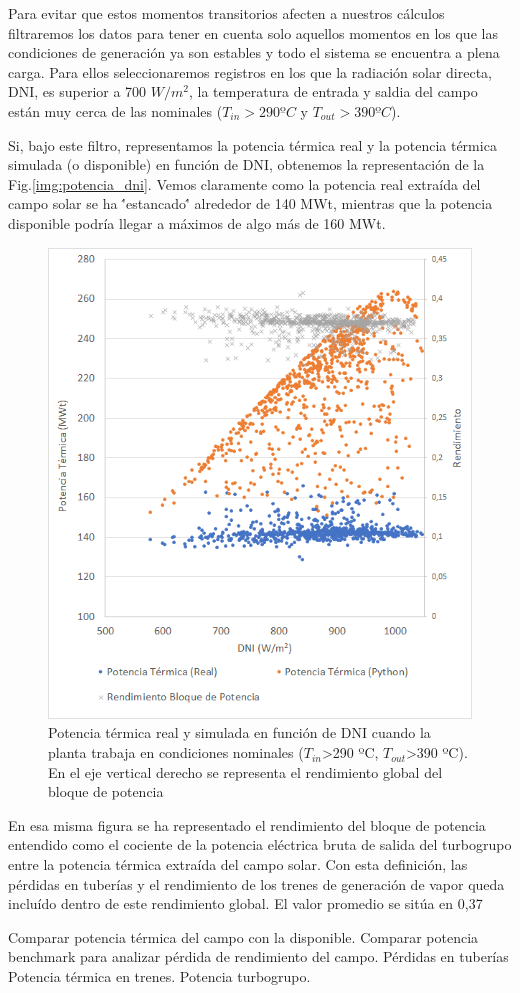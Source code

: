 Para evitar que estos momentos transitorios afecten a nuestros cálculos filtraremos los datos para tener en cuenta solo aquellos momentos en los que las condiciones de generación ya son estables y todo el sistema se encuentra a plena carga. Para ellos seleccionaremos registros en los que la radiación solar directa, DNI, es superior a 700 $W/m^2$, la temperatura de entrada y saldia del campo están muy cerca de las nominales ($T_{in}>290ºC$  y $T_{out}>390ºC$). 

Si, bajo este filtro, representamos la potencia térmica real y la potencia térmica simulada (o disponible) en función de DNI, obtenemos la representación de la Fig.\ref{img:potencia_dni}. Vemos claramente como  la potencia real extraída del campo solar se ha \''estancado\'' alrededor de 140 MWt, mientras que la potencia disponible podría llegar a máximos de algo más de 160 MWt. 

\begin{figure}[H]
\includegraphics[width=0.9\linewidth]{images/potencia_dni_aste1b.png}
\caption{Potencia térmica real y simulada en función de DNI cuando la planta trabaja en condiciones nominales ($T_{in}$>290 ºC, $T_{out}$>390 ºC). En el eje vertical derecho se representa el rendimiento global del bloque de potencia} 
\label{fig:potenica_dni}
\end{figure}

En esa misma figura se ha representado el rendimiento del bloque de potencia entendido como el cociente de la potencia eléctrica bruta de salida del turbogrupo entre la potencia térmica extraída del campo solar. Con esta definición, las pérdidas en tuberías y el rendimiento de los trenes de generación de vapor queda incluído dentro de este rendimiento global.  El valor promedio se sitúa en 0,37

Comparar potencia térmica del campo con la disponible.
Comparar potencia benchmark para analizar pérdida de rendimiento del campo.
Pérdidas en tuberías
Potencia térmica en trenes.
Potencia turbogrupo.



 

